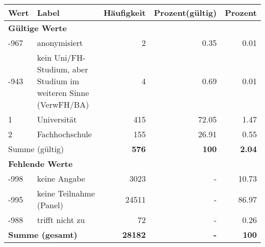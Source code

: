      \begin{longtable}{lXrrr}
     \toprule
     \textbf{Wert} & \textbf{Label} & \textbf{Häufigkeit} & \textbf{Prozent(gültig)} & \textbf{Prozent} \\
     \endhead
     \midrule
     \multicolumn{5}{l}{\textbf{Gültige Werte}}\\

     -967 &
     \multicolumn{1}{X}{ anonymisiert   } &


       \num{2} &
       \num[round-mode=places,round-precision=2]{0.35} &
         \num[round-mode=places,round-precision=2]{0.01} \\

     -943 &
     \multicolumn{1}{X}{ kein Uni/FH-Studium, aber Studium im weiteren Sinne (VerwFH/BA)   } &


       \num{4} &
       \num[round-mode=places,round-precision=2]{0.69} &
         \num[round-mode=places,round-precision=2]{0.01} \\

     1 &
     \multicolumn{1}{X}{ Universität   } &


       \num{415} &
       \num[round-mode=places,round-precision=2]{72.05} &
         \num[round-mode=places,round-precision=2]{1.47} \\

     2 &
     \multicolumn{1}{X}{ Fachhochschule   } &


       \num{155} &
       \num[round-mode=places,round-precision=2]{26.91} &
         \num[round-mode=places,round-precision=2]{0.55} \\
     \midrule
     \multicolumn{2}{l}{Summe (gültig)} &
       \textbf{\num{576}} &
     \textbf{\num{100}} &
       \textbf{\num[round-mode=places,round-precision=2]{2.04}} \\
     \multicolumn{5}{l}{\textbf{Fehlende Werte}}\\
       -998 &
       keine Angabe &
         \num{3023} &
        - &
         \num[round-mode=places,round-precision=2]{10.73} \\
       -995 &
       keine Teilnahme (Panel) &
         \num{24511} &
        - &
         \num[round-mode=places,round-precision=2]{86.97} \\
       -988 &
       trifft nicht zu &
         \num{72} &
        - &
         \num[round-mode=places,round-precision=2]{0.26} \\
     \midrule
     \multicolumn{2}{l}{\textbf{Summe (gesamt)}} &
          \textbf{\num{28182}} &
        \textbf{-} &
        \textbf{\num{100}} \\
     \bottomrule
     \end{longtable}
     
